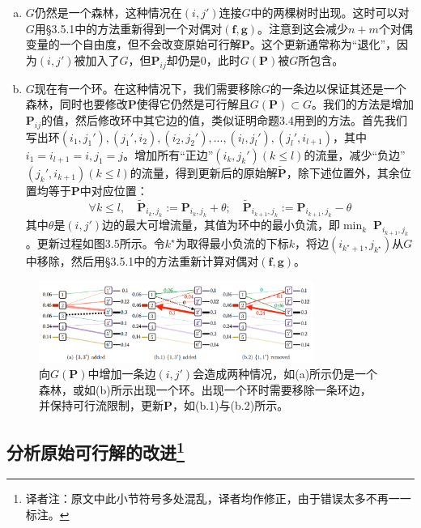 \documentclass[cn,10pt,math=newtx,citestyle=gb7714-2015,bibstyle=gb7714-2015]{elegantbook}
\begin{document}
\begin{enumerate}[(a)]
    \item $G$仍然是一个森林，这种情况在$(i,j')$连接$G$中的两棵树时出现。这时可以对$G$用\S 3.5.1中的方法重新得到一个对偶对$(\mathbf{f,g})$。注意到这会减少$n+m$个对偶变量的一个自由度，但不会改变原始可行解$\mathbf{P}$。这个更新通常称为“退化”，因为$(i,j')$被加入了$G$，但$\mathbf{P}_{ij}$却仍是$0$，此时$G(\mathbf{P})$被$G$所包含。
    \item $G$现在有一个环。在这种情况下，我们需要移除$G$的一条边以保证其还是一个森林，同时也要修改$\mathbf{P}$使得它仍然是可行解且$G(\mathbf{P})\subset G$。我们的方法是增加$\mathbf{P}_{ij}$的值，然后修改环中其它边的值，类似证明命题3.4用到的方法。首先我们写出环$(i_1,j_1'),(j_1',i_2),(i_2,j_2'),...,(i_l,j_l'),(j_l',i_{l+1})$，其中$i_1=i_{l+1}=i,j_1=j$。增加所有“正边”$(i_k,j_k')(k\leq l)$的流量，减少“负边”$(j_k',i_{k+1})(k\leq l)$的流量，得到更新后的原始解$\mathbf{\tilde P}$，除下述位置外，其余位置均等于$\mathbf{P}$中对应位置：
    \begin{equation*}
        \forall k\leq l,\quad \mathbf{\tilde{P}}_{i_k,j_k}:=\mathbf{P}_{i_k,j_k}+\theta; \quad \mathbf{\tilde{P}}_{i_{k+1},j_k}:=\mathbf{P}_{i_{k+1},j_k}-\theta
    \end{equation*}
    其中$\theta$是$(i,j')$边的最大可增流量，其值为环中的最小负流，即$\min_k\;\mathbf{P}_{i_{k+1},j_k}$。更新过程如图3.5所示。令$k^\star$为取得最小负流的下标$k$，将边$(i_{k^\star+1},j_{k^\star})$从$G$中移除，然后用\S 3.5.1中的方法重新计算对偶对$(\mathbf{f,g})$。
\end{enumerate}

\begin{figure}[H]
    \centering
    \includegraphics[width=0.8\textwidth]{figure/fig3.5.png}
    \caption{向$G(\mathbf{P})$中增加一条边$(i,j')$会造成两种情况，如(a)所示仍是一个森林，或如(b)所示出现一个环。出现一个环时需要移除一条环边，并保持可行流限制，更新$\mathbf{P}$，如(b.1)与(b.2)所示。}
    \label{图3.5}
\end{figure}

\subsection{分析原始可行解的改进\footnote{译者注：原文中此小节符号多处混乱，译者均作修正，由于错误太多不再一一标注。}}
\end{document}
